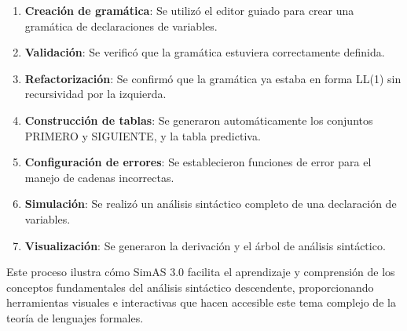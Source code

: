 \begin{enumerate}
    \item \textbf{Creación de gramática}: Se utilizó el editor guiado para crear una gramática de declaraciones de variables.
    \item \textbf{Validación}: Se verificó que la gramática estuviera correctamente definida.
    \item \textbf{Refactorización}: Se confirmó que la gramática ya estaba en forma LL(1) sin recursividad por la izquierda.
    \item \textbf{Construcción de tablas}: Se generaron automáticamente los conjuntos PRIMERO y SIGUIENTE, y la tabla predictiva.
    \item \textbf{Configuración de errores}: Se establecieron funciones de error para el manejo de cadenas incorrectas.
    \item \textbf{Simulación}: Se realizó un análisis sintáctico completo de una declaración de variables.
    \item \textbf{Visualización}: Se generaron la derivación y el árbol de análisis sintáctico.
\end{enumerate}

Este proceso ilustra cómo SimAS 3.0 facilita el aprendizaje y comprensión de los conceptos fundamentales del análisis sintáctico descendente, proporcionando herramientas visuales e interactivas que hacen accesible este tema complejo de la teoría de lenguajes formales.
